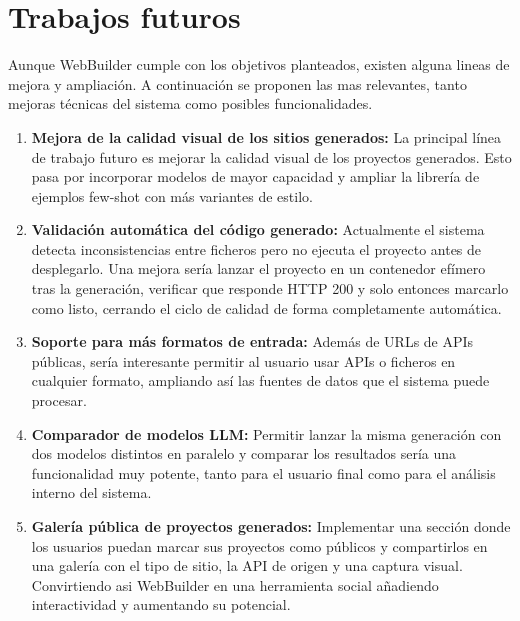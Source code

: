 \section{Trabajos futuros}
\label{sec:trabajos_futuros}

Aunque WebBuilder cumple con los objetivos planteados, existen alguna lineas de mejora y ampliación. A continuación se proponen las mas relevantes, tanto mejoras técnicas del sistema como posibles funcionalidades.

\begin{enumerate}
  \item \textbf{Mejora de la calidad visual de los sitios generados:} La principal línea de trabajo futuro es mejorar la calidad visual de los proyectos generados. Esto pasa por incorporar modelos de mayor capacidad y ampliar la librería de ejemplos few-shot con más variantes de estilo.
  
  \item \textbf{Validación automática del código generado:} Actualmente el sistema detecta inconsistencias entre ficheros pero no ejecuta el proyecto antes de desplegarlo. Una mejora sería lanzar el proyecto en un contenedor efímero tras la generación, verificar que responde HTTP 200 y solo entonces marcarlo como listo, cerrando el ciclo de calidad de forma completamente automática.
  
  \item \textbf{Soporte para más formatos de entrada:} Además de URLs de APIs públicas, sería interesante permitir al usuario usar APIs o ficheros en cualquier formato, ampliando así las fuentes de datos que el sistema puede procesar.
  
  \item \textbf{Comparador de modelos LLM:} Permitir lanzar la misma generación con dos modelos distintos en paralelo y comparar los resultados sería una funcionalidad muy potente, tanto para el usuario final como para el análisis interno del sistema.
  
  \item \textbf{Galería pública de proyectos generados:} Implementar una sección donde los usuarios puedan marcar sus proyectos como públicos y compartirlos en una galería con el tipo de sitio, la API de origen y una captura visual. Convirtiendo asi WebBuilder en una herramienta social añadiendo interactividad y aumentando su potencial.
\end{enumerate}